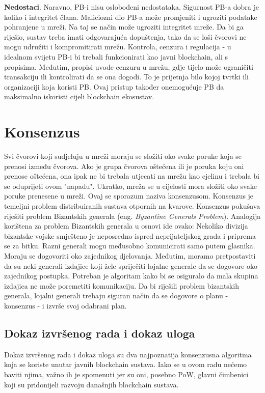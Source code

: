 \documentclass[times, utf8, diplomski]{fer}
\begin{document}
\textbf{Nedostaci}. Naravno, PB-i nisu oslobođeni nedostataka. Sigurnost PB-a dobra je koliko i integritet člana. Maliciozni dio PB-a može promjeniti i ugroziti podatake pohranjene u mreži. Na taj se način može ugroziti integritet mreže. Da bi ga riješio, sustav treba imati odgovarajuća dopuštenja, tako da se loši čvorovi ne mogu udružiti i kompromitirati mrežu. Kontrola, cenzura i regulacija - u idealnom svijetu PB-i bi trebali funkcionirati kao javni blockchain, ali s propisima. Međutim, propisi uvode cenzuru u mrežu, gdje tijelo može ograničiti transakciju ili kontrolirati da se ona dogodi. To je prijetnja bilo kojoj tvrtki ili organizaciji koja koristi PB. Ovaj pristup također onemogućuje PB da maksimalno iskoristi cijeli blockchain ekosustav.

\section{Konsenzus}
Svi čvorovi koji sudjeluju u mreži moraju se složiti oko svake poruke koja se prenosi između čvorova. Ako je grupa čvorova oštećena ili je poruka koju oni prenose oštećena, ona ipak ne bi trebala utjecati na mrežu kao cjelinu i trebala bi se oduprijeti ovom "napadu". Ukratko, mreža se u cijelosti mora složiti oko svake poruke prenesene u mreži. Ovaj se sporazum naziva konsenzusom. Konsenzus je temeljni problem distribuiranih sustava otpornih na kvarove. Konsenzus pokušava riješiti problem Bizantskih generala
(eng.  \textit{Byzantine Generals Problem}). Analogija korištena za problem Bizantskih generala u osnovi ide ovako: Nekoliko divizija bizantske vojske smješteno je neposredno ispred neprijateljskog grada i priprema se za bitku. Razni generali mogu međusobno komunicirati samo putem glasnika. Moraju se dogovoriti oko zajednikog djelovanja. Međutim, moramo pretpostaviti da su neki generali izdajice koji žele spriječiti lojalne generale da se dogovore oko zajednikog postupka. Potreban je algoritam kako bi se osiguralo da mala skupina izdajica ne može poremetiti komunikaciju. Da bi riješili problem bizantskih generala, lojalni generali trebaju siguran način da se dogovore o planu - konsenzus - i izvrše svoj odabrani plan.

\subsection{Dokaz izvršenog rada i dokaz uloga}
Dokaz izvršenog rada i dokaz uloga su dva najpoznatija konsenzusna algoritma koja se koriste unutar javnih blockchain sustava. Iako se u ovom radu nećemo baviti njima, važno ih je spomenuti jer su oni, posebno PoW, glavni čimbenici koji su pridonijeli razvoju današnjih blockchain sustava.
\end{document}
